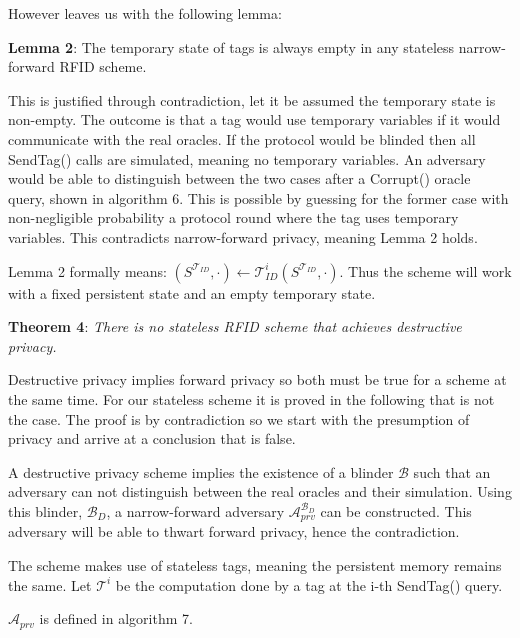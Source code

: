     However \cite{Impossibility_results} leaves us with the following lemma:

    \textbf{Lemma 2}: The temporary state of tags is always empty in any stateless narrow-forward RFID scheme. 

    This is justified through contradiction, let it be assumed the temporary state is non-empty. The outcome is that a tag would use temporary 
    variables if it would communicate with the real oracles. If the protocol would be blinded then all SendTag() calls are simulated, 
    meaning no temporary variables. An adversary would be able to distinguish between the two cases after a Corrupt() oracle query, 
    shown in algorithm 6. This is possible by guessing for the former case with non-negligible probability a protocol round where the
    tag uses temporary variables. This contradicts narrow-forward privacy, meaning Lemma 2 holds.

    Lemma 2 formally means: $(S^{\mathcal{T}_{ID}}, \cdot) \gets \mathcal{T}_{ID}^i(S^{\mathcal{T}_{ID}}, \cdot)$. Thus the scheme will 
    work with a fixed persistent state and an empty temporary state.
    
    \textbf{Theorem 4}: \textit{There is no stateless RFID scheme that achieves destructive privacy.}
    
    Destructive privacy implies forward privacy so both must be true for a scheme at the same time. For our stateless scheme it is proved in the following
    that is not the case. The proof is by contradiction so we start with the presumption of privacy and arrive at a conclusion that is false.

    A destructive privacy scheme implies the existence of a blinder $\mathcal{B}$ such that an adversary can not distinguish between the real oracles and 
    their simulation.
    Using this blinder, $\mathcal{B}_D$, a narrow-forward adversary $\mathcal{A}_{prv}^{\mathcal{B}_D}$ can be constructed. This adversary will be 
    able to thwart forward privacy, hence the contradiction.

    The scheme makes use of stateless tags, meaning the persistent memory remains the same. Let $\mathcal{T}^{i}$ be the computation done by a tag
    at the i-th SendTag() query. 

    $\mathcal{A}_{prv}$ is defined in algorithm 7.


